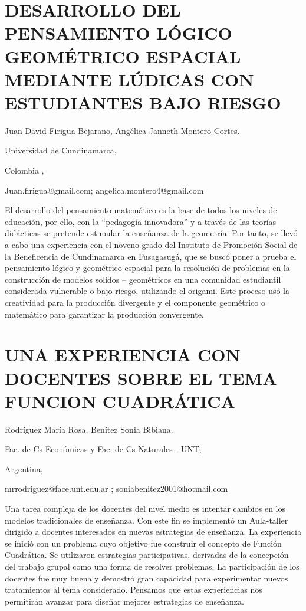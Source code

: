 \section{DESARROLLO DEL PENSAMIENTO LÓGICO GEOMÉTRICO ESPACIAL MEDIANTE LÚDICAS
CON ESTUDIANTES BAJO RIESGO}

\begin{datos}

Juan David Firigua Bejarano, Angélica Janneth Montero Cortes.

Universidad de Cundinamarca,

Colombia ,

Juan.firigua@gmail.com; angelica.montero4@gmail.com 

\end{datos}

El desarrollo del pensamiento matemático es la base de todos los niveles
de educación, por ello, con la “pedagogía innovadora” y a través de
las teorías didácticas se pretende estimular la enseñanza de la geometría.
Por tanto, se llevó a cabo una experiencia con el noveno grado del
Instituto de Promoción Social de la Beneficencia de Cundinamarca en
Fusagasugá, que se buscó poner a prueba el pensamiento lógico y geométrico
espacial para la resolución de problemas en la construcción de modelos
solidos – geométricos en una comunidad estudiantil considerada vulnerable
o bajo riesgo, utilizando el origami. Este proceso usó la creatividad
para la producción divergente y el componente geométrico o matemático
para garantizar la producción convergente.

\setcounter{section}{94}


\section{UNA EXPERIENCIA CON DOCENTES SOBRE EL TEMA FUNCION CUADRÁTICA }

\begin{datos}

Rodríguez María Rosa, Benítez Sonia Bibiana.

Fac. de Cs Económicas y Fac. de Cs Naturales - UNT,

Argentina,

mrrodriguez@face.unt.edu.ar ; soniabenitez2001@hotmail.com

\end{datos}

Una tarea compleja de los docentes del nivel medio es intentar cambios
en los modelos tradicionales de enseñanza. Con este fin se implementó
un Aula-taller dirigido a docentes interesados en nuevas estrategias
de enseñanza. La experiencia se inició con un problema cuyo objetivo
fue construir el concepto de Función Cuadrática. Se utilizaron estrategias
participativas, derivadas de la concepción del trabajo grupal como
una forma de resolver problemas. La participación de los docentes
fue muy buena y demostró gran capacidad para experimentar nuevos tratamientos
al tema considerado. Pensamos que estas experiencias nos permitirán
avanzar para diseñar mejores estrategias de enseñanza. 



